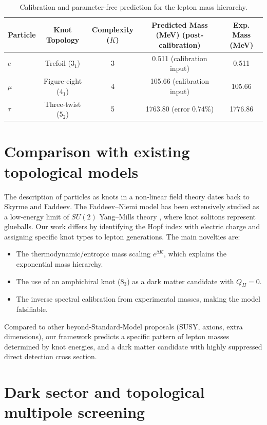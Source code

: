 \documentclass[12pt,a4paper]{article}
\begin{document}
\begin{table}[H]
\centering
\caption{Calibration and parameter-free prediction for the lepton mass hierarchy.}
\label{tab:masses}
\begin{tabular}{lcccc}
\hline
Particle & Knot Topology & Complexity ($K$) & Predicted Mass (MeV) (post-calibration) & Exp. Mass (MeV) \\
\hline
$e$ & Trefoil ($3_1$) & 3 & 0.511 (calibration input) & 0.511 \\
$\mu$ & Figure-eight ($4_1$) & 4 & 105.66 (calibration input) & 105.66 \\
$\tau$ & Three-twist ($5_2$) & 5 & 1763.80 (error 0.74\%) & 1776.86 \\
\hline
\end{tabular}
\end{table}

\section{Comparison with existing topological models}
\label{sec:comparison}

The description of particles as knots in a non‑linear field theory dates back to Skyrme and Faddeev. The Faddeev–Niemi model has been extensively studied as a low‑energy limit of $SU(2)$ Yang–Mills theory \cite{Faddeev1999,Niemi2000}, where knot solitons represent glueballs. Our work differs by identifying the Hopf index with electric charge and assigning specific knot types to lepton generations. The main novelties are:
\begin{itemize}
\item The thermodynamic/entropic mass scaling $e^{\beta K}$, which explains the exponential mass hierarchy.
\item The use of an amphichiral knot ($8_3$) as a dark matter candidate with $Q_H=0$.
\item The inverse spectral calibration from experimental masses, making the model falsifiable.
\end{itemize}
Compared to other beyond‑Standard‑Model proposals (SUSY, axions, extra dimensions), our framework predicts a specific pattern of lepton masses determined by knot energies, and a dark matter candidate with highly suppressed direct detection cross section.

\section{Dark sector and topological multipole screening}
\label{sec:dark}
\end{document}
